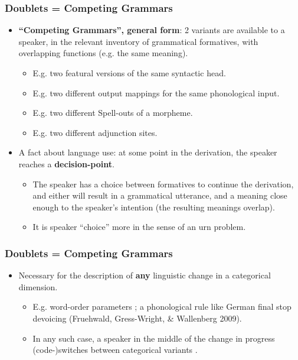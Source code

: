 \documentclass[hyperref={pdfpagelabels=false}]{beamer}
\begin{document}
\begin{frame}
\frametitle{Doublets = Competing Grammars \citep{kroch1994}}
\begin{itemize}
	\item[ ] \textbf{``Competing Grammars'', general form}: 2 variants are available to a speaker, in the relevant inventory of grammatical formatives, with overlapping functions (e.g. the same meaning).
		\begin{itemize}
			\item E.g. two featural versions of the same syntactic head. 
			\item E.g. two different output mappings for the same phonological input.
			\item E.g. two different Spell-outs of a morpheme.
			\item E.g. two different adjunction sites.
		\end{itemize}
	\item[ ] A fact about language use: at some point in the derivation, the speaker reaches a \textbf{decision-point}.
		\begin{itemize}
		\item The speaker has a choice between formatives to continue the derivation, and either will result in a grammatical utterance, and a meaning close enough to the speaker's intention (the resulting meanings overlap).
		\item It is speaker ``choice'' more in the sense of an urn problem.
		\end{itemize}
\end{itemize}
\end{frame}



\begin{frame}
\frametitle{Doublets = Competing Grammars}
\begin{itemize}
	\item Necessary for the description of \textbf{any} linguistic change in a categorical dimension.
		\begin{itemize} 
			\item E.g. word-order parameters \citep{pintzuk1991, santorini1992}; a phonological rule like German final stop devoicing (Fruehwald, Gress-Wright, \& Wallenberg 2009)\nocite{fruehwaldgresswallenberg2013}. 
			\item In any such case, a speaker in the middle of the change in progress (code-)switches between categorical variants \citep{kroch1989}.
		\end{itemize} 
\end{itemize}
\end{frame}
\end{document}
